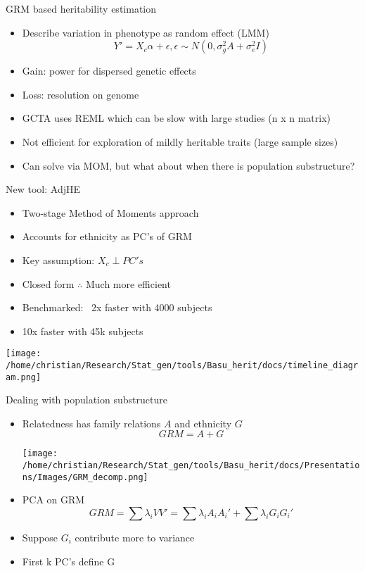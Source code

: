 \documentclass[
  ignorenonframetext,
]{beamer}
\begin{document}
\begin{frame}{GRM based heritability estimation}
\begin{itemize}
	\item Describe variation in phenotype as random effect (LMM)
		$$ Y' = X_c\alpha + \epsilon, \epsilon \sim N(0, \sigma_g^2 A + \sigma_e^2 I)$$
	\item Gain: power for dispersed genetic effects
	\item Loss: resolution on genome
	\item GCTA uses REML which can be slow with large studies (n x n matrix)
	\item Not efficient for exploration of mildly heritable traits (large sample sizes)
	\item Can solve via MOM, but what about when there is population substructure?
\end{itemize}
\end{frame}

\begin{frame}{New tool: AdjHE}
	\begin{itemize}
		\item Two-stage Method of Moments approach
		\item Accounts for ethnicity as PC's of GRM
		\item Key assumption: $X_c \perp PC's$
		\item Closed form $\therefore$ Much more efficient 
		\item Benchmarked: ~2x faster with 4000 subjects
		\item 10x faster with 45k subjects
	\end{itemize}
	 \texttt{[image: /home/christian/Research/Stat\_gen/tools/Basu\_herit/docs/timeline\_diagram.png]}
\end{frame}



\begin{frame}{Dealing with population substructure}
\begin{itemize}
	\item Relatedness has family relations $A$ and ethnicity $G$
	$$ GRM = A + G$$
	\begin{center}
		\texttt{[image: /home/christian/Research/Stat\_gen/tools/Basu\_herit/docs/Presentations/Images/GRM\_decomp.png]}
	\end{center}
	\item PCA on GRM
	$$GRM = \sum \lambda_i VV' = \sum \lambda_i A_iA_i' + \sum \lambda_i G_iG_i' $$
	\item Suppose $G_i$ contribute more to variance
	\item First k PC's define G
\end{itemize}
\end{frame}
\end{document}
